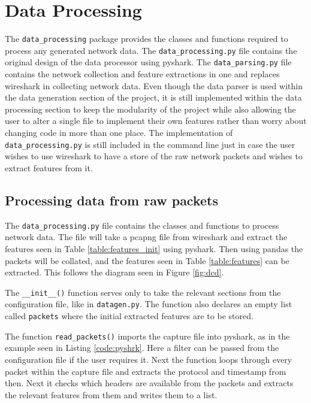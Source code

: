 \section{Data Processing}
The \texttt{data\_processing} package provides the classes and functions required to process any generated network data. The \texttt{data\_processing.py} file contains the original design of the data processor using pyshark. The \texttt{data\_parsing.py} file contains the network collection and feature extractions in one and replaces wireshark in collecting network data. Even though the data parser is used within the data generation section of the project, it is still implemented within the data processing section to keep the modularity of the project while also allowing the user to alter a single file to implement their own features rather than worry about changing code in more than one place. The implementation of \texttt{data\_processing.py} is still included in the command line just in case the user wishes to use wireshark to have a store of the raw network packets and wishes to extract features from it.

\subsection{Processing data from raw packets}
The \texttt{data\_processing.py} file contains the classes and functions to process network data. The file will take a pcapng file from wireshark and extract the features seen in Table \ref{table:features_init} using pyshark. Then using pandas the packets will be collated, and the features seen in Table \ref{table:features} can be extracted. This follows the diagram seen in Figure \ref{fig:dcd}. 

The \texttt{\_\_init\_\_()} function serves only to take the relevant sections from the configuration file, like in \texttt{datagen.py}. The function also declares an empty list called \texttt{packets} where the initial extracted features are to be stored. 

The function \texttt{read\_packets()} imports the capture file into pyshark, as in the example seen in Listing \ref{code:pyshrk}. Here a filter can be passed from the configuration file if the user requires it. Next the function loops through every packet within the capture file and extracts the protocol and timestamp from then. Next it checks which headers are available from the packets and extracts the relevant features from them and writes them to a list.

